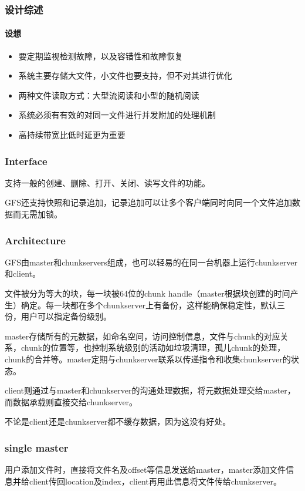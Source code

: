 \documentclass{ctexart}
\begin{document}
\subsubsection{设计综述}
\paragraph{设想}
\begin{itemize}
	\item 要定期监视检测故障，以及容错性和故障恢复
	\item 系统主要存储大文件，小文件也要支持，但不对其进行优化
	\item 两种文件读取方式：大型流阅读和小型的随机阅读
	\item 系统必须有有效的对同一文件进行并发附加的处理机制
	\item 高持续带宽比低时延更为重要
\end{itemize}
\subsubsection{Interface}
支持一般的创建、删除、打开、关闭、读写文件的功能。

GFS还支持快照和记录追加，记录追加可以让多个客户端同时向同一个文件追加数据而无需加锁。
\subsubsection{Architecture}
GFS由master和chunkservers组成，也可以轻易的在同一台机器上运行chunkserver和client。

文件被分为等大的块，每一块被64位的chunk handle（master根据块创建的时间产生）确定。每一块都在多个chunkserver上有备份，这样能确保稳定性，默认三份，用户可以指定备份级别。

master存储所有的元数据，如命名空间，访问控制信息，文件与chunk的对应关系，chunk的位置等，也控制系统级别的活动如垃圾清理，孤儿chunk的处理，chunk的合并等。master定期与chunkserver联系以传递指令和收集chunkserver的状态。

client则通过与master和chunkserver的沟通处理数据，将元数据处理交给master，而数据承载则直接交给chunkserver。

不论是client还是chunkserver都不缓存数据，因为这没有好处。
\subsubsection{single master}
用户添加文件时，直接将文件名及offset等信息发送给master，master添加文件信息并给client传回location及index，client再用此信息将文件传给chunkserver。
\end{document}
